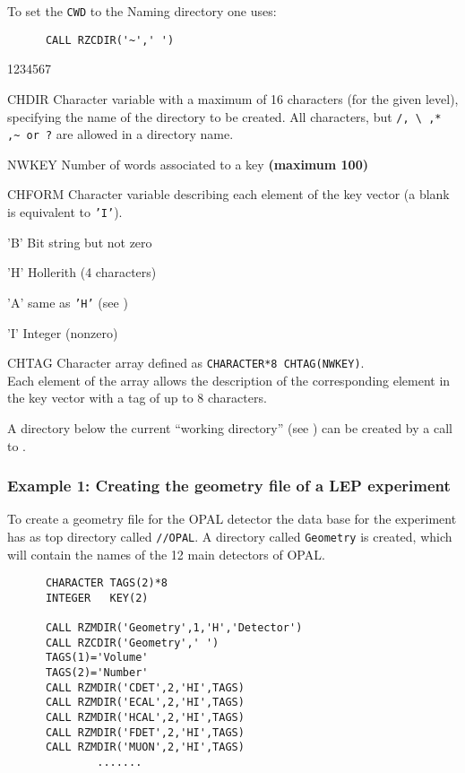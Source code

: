 To set the {\tt CWD} to the Naming directory one uses:

\begin{verbatim}
      CALL RZCDIR('~',' ')
\end{verbatim}


\begin{DLtt}{1234567}
\item[CHDIR]Character variable with a maximum of 16 characters (for the given
level), specifying the name of the directory to be
created. All characters, but \verb!/, \ ,* ,~ or ?!
are allowed in a directory name.
\item[NWKEY]Number of words associated to a key {\bf (maximum 100)}
\item[CHFORM]Character variable describing each element of the key vector
(a blank is equivalent to {\tt'I'}).
\begin{DLtt}{12}
\item['B'] Bit string but not zero
\item['H'] Hollerith (4 characters)
\item['A'] same as {\tt'H'} (see )
\item['I'] Integer (nonzero)
\end{DLtt}
\item[CHTAG] Character array defined as {\tt CHARACTER*8 CHTAG(NWKEY)}.\\
Each element of the array allows the description of the corresponding
element in the key vector with a tag of up to 8 characters.
\end{DLtt}

A directory below the current ``working directory'' (see )
can be created by a call to .

\subsubsection*{Example 1: Creating the geometry file of a LEP experiment}

To create a geometry file for the OPAL detector
the data base for the experiment has as top directory called
{\tt //OPAL}.
A directory called {\tt Geometry} is created, which will contain
the names of the 12 main detectors of OPAL.

\begin{verbatim}
      CHARACTER TAGS(2)*8
      INTEGER   KEY(2)
 
      CALL RZMDIR('Geometry',1,'H','Detector')
      CALL RZCDIR('Geometry',' ')
      TAGS(1)='Volume'
      TAGS(2)='Number'
      CALL RZMDIR('CDET',2,'HI',TAGS)
      CALL RZMDIR('ECAL',2,'HI',TAGS)
      CALL RZMDIR('HCAL',2,'HI',TAGS)
      CALL RZMDIR('FDET',2,'HI',TAGS)
      CALL RZMDIR('MUON',2,'HI',TAGS)
              .......
\end{verbatim}

